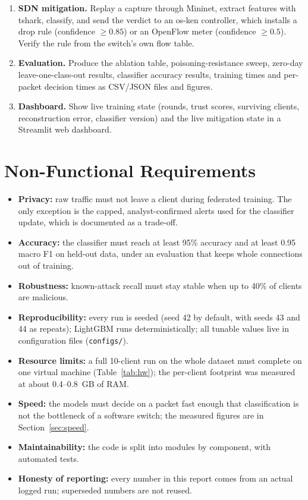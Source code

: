 \begin{enumerate}
  \item[FR9] \textbf{SDN mitigation.} Replay a capture through Mininet, extract features with tshark, classify, and send the verdict to an os-ken controller, which installs a drop rule (confidence $\geq0.85$) or an OpenFlow meter (confidence $\geq0.5$). Verify the rule from the switch's own flow table.
  \item[FR10] \textbf{Evaluation.} Produce the ablation table, poisoning-resistance sweep, zero-day leave-one-class-out results, classifier accuracy results, training times and per-packet decision times as CSV/JSON files and figures.
  \item[FR11] \textbf{Dashboard.} Show live training state (rounds, trust scores, surviving clients, reconstruction error, classifier version) and the live mitigation state in a Streamlit web dashboard.
\end{enumerate}

\section{Non-Functional Requirements}
\begin{itemize}
  \item \textbf{Privacy:} raw traffic must not leave a client during federated training. The only exception is the capped, analyst-confirmed alerts used for the classifier update, which is documented as a trade-off.
  \item \textbf{Accuracy:} the classifier must reach at least 95\% accuracy and at least 0.95 macro F1 on held-out data, under an evaluation that keeps whole connections out of training.
  \item \textbf{Robustness:} known-attack recall must stay stable when up to 40\% of clients are malicious.
  \item \textbf{Reproducibility:} every run is seeded (seed 42 by default, with seeds 43 and 44 as repeats); LightGBM runs deterministically; all tunable values live in configuration files (\texttt{configs/}).
  \item \textbf{Resource limits:} a full 10-client run on the whole dataset must complete on one virtual machine (Table~\ref{tab:hw}); the per-client footprint was measured at about 0.4--0.8~GB of RAM.
  \item \textbf{Speed:} the models must decide on a packet fast enough that classification is not the bottleneck of a software switch; the measured figures are in Section~\ref{sec:speed}.
  \item \textbf{Maintainability:} the code is split into modules by component, with \testcount{} automated tests.
  \item \textbf{Honesty of reporting:} every number in this report comes from an actual logged run; superseded numbers are not reused.
\end{itemize}

